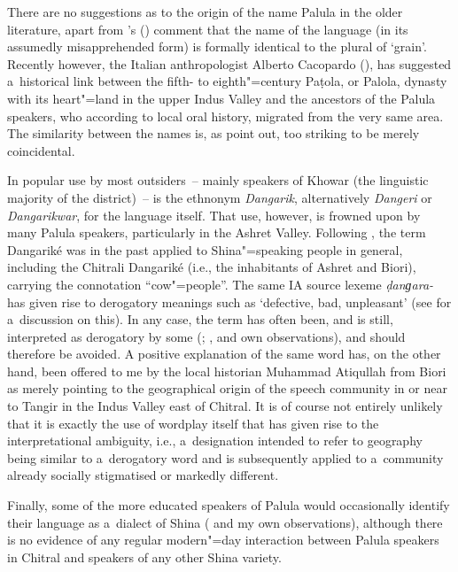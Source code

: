 \largerpage
There are no suggestions as to the origin of the name Palula in the older literature, apart from \citeauthor{morgenstierne1941}'s (\citeyear[53]{morgenstierne1941}) comment that the name of the language (in its assumedly misapprehended form) is formally identical to the plural of `grain'. Recently however, the Italian anthropologist Alberto Cacopardo (\citeyear[91]{cacopardo2001}), has suggested a~historical link between the fifth- to eighth"=century Paṭola, or Palola, dynasty with its heart"=land in the upper Indus Valley and the ancestors of the Palula speakers, who according to local oral history, migrated from the very same area. The similarity between the names is, as \citet[3]{schmidtkohistani2008} point out, too striking to be merely coincidental.


In popular use by most outsiders~-- mainly speakers of Khowar (the linguistic majority of the district)~-- is the ethnonym \textit{Dangarik},
alternatively \textit{Dangeri} or \textit{Dangarikwar}, for the language itself. That use, however,
is frowned upon by many Palula speakers, particularly in the Ashret Valley. Following
\citet[113]{biddulph1986}, the term Dangariké was in the past applied to Shina"=speaking people in general, including the Chitrali Dangariké (i.e., the inhabitants of Ashret and Biori), carrying the
connotation ``cow"=people''. The same IA source lexeme \textit{ḍanɡara-}
\citep[5526, 5524]{turner1966} has given rise to derogatory meanings such as `defective, bad,
unpleasant' (see \citealt[81]{cacopardo2001} for a~discussion on this). In any case, the term has
often been, and is still, interpreted as derogatory by some (\citealt[69]{decker1992a};
\citeyear[160]{decker1996}, and own observations), and should therefore be avoided. A positive
explanation of the same word has, on the other hand, been offered to me by the local historian Muhammad Atiqullah from Biori as merely pointing to the geographical origin of the speech community in or near to
Tangir in the Indus Valley east of Chitral. It is of course not entirely unlikely that it is exactly
the use of wordplay itself that has given rise to the interpretational ambiguity, i.e., a~designation
intended to refer to geography being similar to a~derogatory word and is subsequently applied to
a~community already socially stigmatised or markedly different.


Finally, some of the more educated speakers of Palula would occasionally identify their language as a~dialect of Shina (\citealt[82]{decker1992a} and my own observations), although there is no evidence of any regular modern"=day interaction between Palula speakers in Chitral and speakers of any other Shina variety. 

